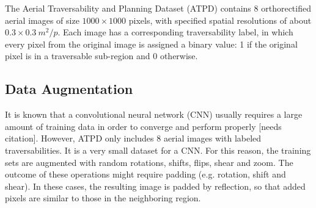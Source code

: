 \documentclass[conference]{IEEEtran}
\begin{document}
The Aerial Traversability and Planning Dataset (ATPD) \cite{borges:2019} contains 8 orthorectified aerial images of size $1000 \times 1000$ pixels, with specified spatial resolutions of about $0.3 \times 0.3 \ m^2/p$.
Each image has a corresponding traversability label, in which every pixel from the original image is assigned a binary value: 1 if the original pixel is in a traversable sub-region and 0 otherwise.



\subsection{Data Augmentation}

It is known that a convolutional neural network (CNN) usually requires a large amount of training data in order to converge and perform properly [needs citation].
However, ATPD only includes 8 aerial images with labeled traversabilities.
It is a very small dataset for a CNN.
For this reason, the training sets are augmented with random rotations, shifts, flips, shear and zoom.
The outcome of these operations might require padding (e.g. rotation, shift and shear).
In these cases, the resulting image is padded by reflection, so that added pixels are similar to those in the neighboring region.
\end{document}
